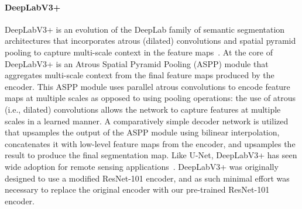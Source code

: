 \paragraph{DeepLabV3+}

DeepLabV3+ is an evolution of the DeepLab family of semantic segmentation architectures that incorporates atrous (dilated) convolutions and spatial pyramid pooling to capture multi-scale context in the feature maps~\citep{chenEncoderDecoderAtrousSeparable2018}.
At the core of DeepLabV3+ is an Atrous Spatial Pyramid Pooling (ASPP) module that aggregates multi-scale context from the final feature maps produced by the encoder.
This ASPP module uses parallel atrous convolutions to encode feature maps at multiple scales as opposed to using pooling operations: the use of atrous (i.e., dilated) convolutions allows the network to capture features at multiple scales in a learned manner.
A comparatively simple decoder network is utilized that upsamples the output of the ASPP module using bilinear interpolation, concatenates it with low-level feature maps from the encoder, and upsamples the result to produce the final segmentation map.
Like U-Net, DeepLabV3+ has seen wide adoption for remote sensing applications~\citep{duIncorporatingDeepLabv3Objectbased2021, liuComparisonMultisourceSatellite2021,krestenitisOilSpillIdentification2019}.
DeepLabV3+ was originally designed to use a modified ResNet-101 encoder, and as such minimal effort was necessary to replace the original encoder with our pre-trained ResNet-101 encoder.

